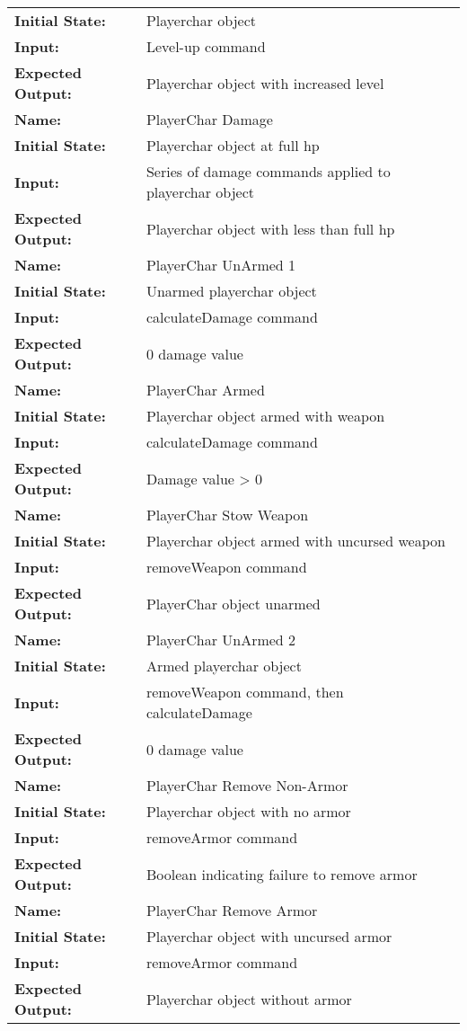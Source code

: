 \documentclass[12pt, titlepage]{article}
\begin{document}
\begin{center}
\begin{longtable}{ l | l }
\textbf{Initial State:} & Playerchar object\\
\textbf{Input:} & Level-up command\\
\textbf{Expected Output:} & Playerchar object with increased level\\
\hline
\textbf{Name:} & PlayerChar Damage\\
\textbf{Initial State:} & Playerchar object at full hp\\
\textbf{Input:} & Series of damage commands applied to playerchar object\\
\textbf{Expected Output:} & Playerchar object with less than full hp\\
\hline
\textbf{Name:} & PlayerChar UnArmed 1\\
\textbf{Initial State:} & Unarmed playerchar object\\
\textbf{Input:} & calculateDamage command\\
\textbf{Expected Output:} & 0 damage value\\
\hline
\textbf{Name:} & PlayerChar Armed\\
\textbf{Initial State:} & Playerchar object armed with weapon\\
\textbf{Input:} & calculateDamage command\\
\textbf{Expected Output:} & Damage value > 0\\
\hline
\textbf{Name:} & PlayerChar Stow Weapon\\
\textbf{Initial State:} & Playerchar object armed with uncursed weapon\\
\textbf{Input:} & removeWeapon command\\
\textbf{Expected Output:} & PlayerChar object unarmed\\
\hline
\textbf{Name:} & PlayerChar UnArmed 2\\
\textbf{Initial State:} & Armed playerchar object\\
\textbf{Input:} & removeWeapon command, then calculateDamage\\
\textbf{Expected Output:} & 0 damage value\\
\hline
\textbf{Name:} & PlayerChar Remove Non-Armor\\
\textbf{Initial State:} & Playerchar object with no armor\\
\textbf{Input:} & removeArmor command\\
\textbf{Expected Output:} & Boolean indicating failure to remove armor\\
\hline
\textbf{Name:} & PlayerChar Remove Armor\\
\textbf{Initial State:} & Playerchar object with uncursed armor\\
\textbf{Input:} & removeArmor command\\
\textbf{Expected Output:} & Playerchar object without armor\\
\hline




\end{longtable}
\end{center}
\end{document}
